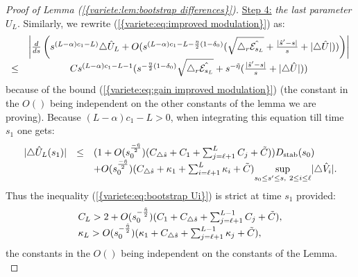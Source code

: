 \documentclass[11pt,a4paper,reqno]{amsart}
\theoremstyle{remark}
\numberwithin{equation}{section}
\begin{document}
\begin{proof}[Proof of Lemma {{\rm (\ref{{variete:lem:bootstrap differences}})}}]
\underline{Step 4:}  \emph{the last parameter $U_L$}. Similarly, we rewrite {{\rm (\ref{{variete:eq:improved modulation}})}} as:
$$
\begin{array}{r c l}
&\left| \frac{d}{ds}\left(s^{(L-\alpha)c_1-L)}\triangle \hat{U}_L+O(s^{(L-\alpha)c_1-L-\frac{\eta}{2}(1-\delta_0)}(\sqrt{\triangle_r \hat{\mathcal{E}_{s_L}}}+\frac{|\hat{s}'-s|}{s}+|\triangle \hat{U}|)) \right)\right| \\
\leq & Cs^{(L-\alpha)c_1-L-1}(s^{-\frac{\eta}{2}(1-\delta_0)}\sqrt{\triangle_r \hat{\mathcal{E}_{s_L}}}+s^{-\tilde{\eta}}(\frac{|\hat{s}'-s|}{s}+|\triangle \hat{U}|))
\end{array}
$$
because of the bound {{\rm (\ref{{variete:eq:gain improved modulation}})}} (the constant in the $O()$ being independent on the other constants of the lemma we are proving). Because $(L-\alpha)c_1-L>0$, when integrating this equation till time $s_1$ one gets:
$$
\begin{array}{r c l}
|\triangle \hat{U}_L(s_1)| &\leq& (1+O(s_0^{\frac{-\tilde{\eta}}{2}})(C_{\triangle \hat{s}}+C_1+\sum_{j=\ell+1}^L C_j+\tilde{C}))D_{\text{stab}}(s_0)\\
&&+O(s_0^{\frac{-\tilde{\eta}}{2}})(C_{\triangle \hat{s}}+\kappa_1+\sum_{i=\ell+1}^L \kappa_i+\tilde{C})\underset{s_0\leq s' \leq s, \ 2\leq i \leq \ell}{\text{sup}}|\triangle \hat{V}_i|.
\end{array}
$$
Thus the inequality {{\rm (\ref{{variete:eq:bootstrap Ui}})}} is strict at time $s_1$ provided:
\begin{equation} \label{variete:bootstrap:condition UL}
\begin{array}{l l}
C_L>2+O(s_0^{-\frac{\tilde{\eta}}{2}})(C_1+C_{\triangle \hat{s}}+\sum_{j=\ell+1}^{L-1} C_j+\tilde{C}), \\
\kappa_L > O(s_0^{-\frac{\tilde{\eta}}{2}})(\kappa_1+C_{\triangle \hat{s}}+\sum_{j=\ell+1}^{L-1} \kappa_j+\tilde{C}),
\end{array}
\end{equation}
the constants in the $O()$ being independent on the constants of the Lemma.\\


\end{proof}
\end{document}
